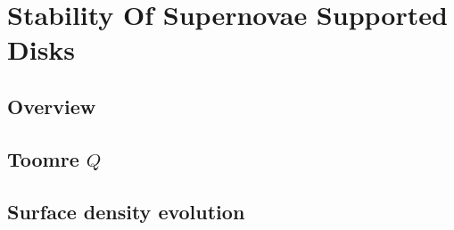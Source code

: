 \chapter{Stability Of Supernovae Supported Disks}\label{sec:analysis}

\section{Overview}


\section{Toomre $Q$}


\clearpage
\section{Surface density evolution}\label{sec:anal_sdevo}

